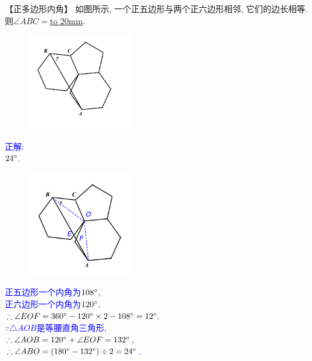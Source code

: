 \item {
    【正多边形内角】
    如图所示, 一个正五边形与两个正六边形相邻, 它们的边长相等. 则$\angle ABC = $\underline{\hbox to 20mm{}}.
    \begin{figure}[H] 
        \centering
        \includegraphics[width=0.4\textwidth]{./pics/Chapter_2/7.png}
    \end{figure}
    \ifshowSolution 
        \fangsong{}\textcolor{blue}{
            正解: \\
            $24\degree$.
            \begin{figure}[H] 
                \centering
                \includegraphics[width=0.4\textwidth]{./pics/Chapter_2/seikai_7.png}
            \end{figure}
            正五边形一个内角为$108\degree$, \\
            正六边形一个内角为$120\degree$. \\
            $\therefore \angle EOF = 360\degree - 120\degree \times 2 - 108\degree = 12\degree.$ \\
            $\because \triangle AOB 是等腰直角三角形$, \\
            $\therefore \angle AOB = 120\degree + \angle EOF = 132\degree$,\\
            $\therefore \angle ABO = (180\degree - 132\degree) \div 2 = 24\degree$.\\
        }
    \else
        \vspace{1cm}
    \fi
}

